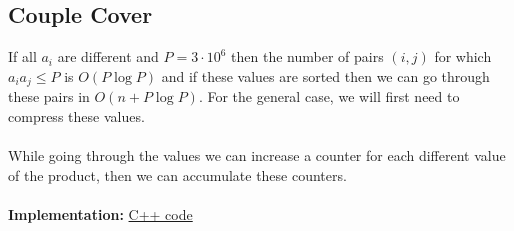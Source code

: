 \documentclass[a4paper,12pt]{article}
\begin{document}
\subsection{Couple Cover}

If all $a_i$ are different and $P = 3 \cdot 10^6$ then the number of pairs $(i,j)$ for which $a_i a_j \leq P$ is $O(P\log P)$ and if these values are sorted then we can go through these pairs in $O(n + P\log P)$. For the general case, we will first need to compress these values.
\\ \\
While going through the values we can increase a counter for each different value of the product, then we can accumulate these counters.
\\ \\
\textbf{Implementation:} \href{http://codeforces.com/contest/691/submission/19352079}{C++ code}
\end{document}
